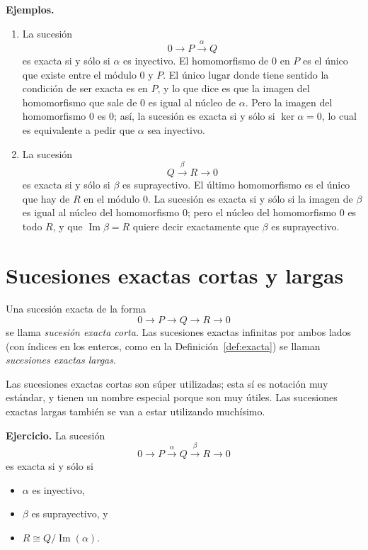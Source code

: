 \documentclass[11pt]{article}
\begin{document}
\medskip\noindent\textbf{Ejemplos.}
\begin{enumerate}
  \item La sucesión
  \[
    0\longrightarrow P\xrightarrow{\ \alpha\ }Q
  \]
  es exacta si y sólo si $\alpha$ es inyectivo. El homomorfismo de $0$ en $P$ es el único que existe entre el módulo $0$ y $P$. El único lugar donde tiene sentido la condición de ser exacta es en $P$, y lo que dice es que la imagen del homomorfismo que sale de $0$ es igual al núcleo de $\alpha$. Pero la imagen del homomorfismo $0$ es $0$; así, la sucesión es exacta si y sólo si $\ker\alpha=0$, lo cual es equivalente a pedir que $\alpha$ sea inyectivo.
  \item La sucesión
  \[
    Q\xrightarrow{\ \beta\ }R\longrightarrow0
  \]
  es exacta si y sólo si $\beta$ es suprayectivo. El último homomorfismo es el único que hay de $R$ en el módulo $0$. La sucesión es exacta si y sólo si la imagen de $\beta$ es igual al núcleo del homomorfismo $0$; pero el núcleo del homomorfismo $0$ es todo $R$, y que $\operatorname{Im}\beta=R$ quiere decir exactamente que $\beta$ es suprayectivo.
\end{enumerate}

\section*{Sucesiones exactas cortas y largas}

\begin{defn}\label{def:corta-larga}
Una sucesión exacta de la forma
\[
  0\longrightarrow P\longrightarrow Q\longrightarrow R\longrightarrow0
\]
se llama \emph{sucesión exacta corta}. Las sucesiones exactas infinitas por ambos lados (con índices en los enteros, como en la Definición~\ref{def:exacta}) se llaman \emph{sucesiones exactas largas}.
\end{defn}

Las sucesiones exactas cortas son súper utilizadas; esta sí es notación muy estándar, y tienen un nombre especial porque son muy útiles. Las sucesiones exactas largas también se van a estar utilizando muchísimo.

\medskip\noindent\textbf{Ejercicio.} La sucesión
\[
  0\longrightarrow P\xrightarrow{\ \alpha\ }Q\xrightarrow{\ \beta\ }R\longrightarrow0
\]
es exacta si y sólo si
\begin{itemize}
  \item $\alpha$ es inyectivo,
  \item $\beta$ es suprayectivo, y
  \item $R\cong Q/\operatorname{Im}(\alpha)$.
\end{itemize}
\end{document}
